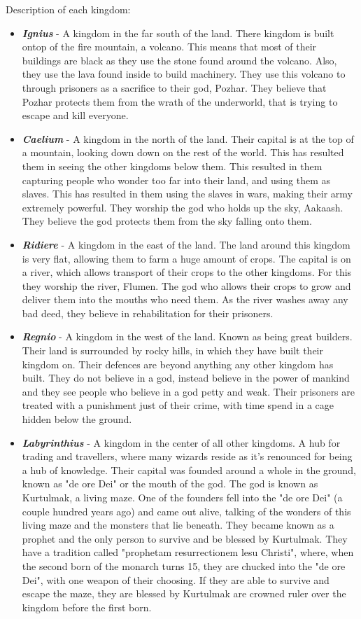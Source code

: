 \documentclass{article}
\begin{document}
                Description of each kingdom:
                \begin{itemize}
                    \item \textbf{\emph{Ignius}} - A kingdom in the far south of the land. There kingdom is built ontop of the fire mountain, a volcano. This means that most of their buildings are black as they use the stone found around the volcano. Also, they use the lava found inside to build machinery. They use this volcano to through prisoners as a sacrifice to their god, Pozhar. They believe that Pozhar protects them from the wrath of the underworld, that is trying to escape and kill everyone.
                    \item \textbf{\emph{Caelium}} - A kingdom in the north of the land. Their capital is at the top of a mountain, looking down down on the rest of the world. This has resulted them in seeing the other kingdoms below them. This resulted in them capturing people who wonder too far into their land, and using them as slaves. This has resulted in them using the slaves in wars, making their army extremely powerful. They worship the god who holds up the sky, Aakaash. They believe the god protects them from the sky falling onto them.
                    \item \textbf{\emph{Ridiere}} - A kingdom in the east of the land. The land around this kingdom is very flat, allowing them to farm a huge amount of crops. The capital is on a river, which allows transport of their crops to the other kingdoms. For this they worship the river, Flumen. The god who allows their crops to grow and deliver them into the mouths who need them. As the river washes away any bad deed, they believe in rehabilitation for their prisoners.
                    \item \textbf{\emph{Regnio}} - A kingdom in the west of the land. Known as being great builders. Their land is surrounded by rocky hills, in which they have built their kingdom on. Their defences are beyond anything any other kingdom has built. They do not believe in a god, instead believe in the power of mankind and they see people who believe in a god petty and weak. Their prisoners are treated with a punishment just of their crime, with time spend in a cage hidden below the ground.
                    \item \textbf{\emph{Labyrinthius}} - A kingdom in the center of all other kingdoms. A hub for trading and travellers, where many wizards reside as it's renounced for being a hub of knowledge. Their capital was founded around a whole in the ground, known as "de ore Dei" or the mouth of the god. The god is known as Kurtulmak, a living maze. One of the founders fell into the "de ore Dei" (a couple hundred years ago) and came out alive, talking of the wonders of this living maze and the monsters that lie beneath. They became known as a prophet and the only person to survive and be blessed by Kurtulmak. They have a tradition called "prophetam resurrectionem lesu Christi", where, when the second born of the monarch turns 15, they are chucked into the "de ore Dei", with one weapon of their choosing. If they are able to survive and escape the maze, they are blessed by Kurtulmak are crowned ruler over the kingdom before the first born.

\end{itemize}
\end{document}
